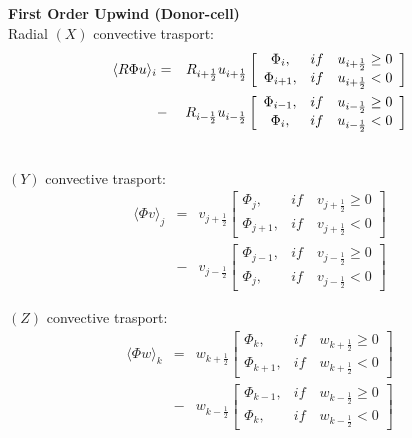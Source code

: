 {\bf First Order Upwind (Donor-cell)} \\

Radial $(X)$ convective trasport:
\begin{eqnarray}
\htmlimage{}
%
\langle R \Phi u \rangle_{i} & = & R_{i+\frac{1}{2}} u_{i+\frac{1}{2}} 
\left[ \begin{array}{cc}
\displaystyle{\Phi_{i}}, & \textstyle{if} \quad u_{i+\frac{1}{2}}  \ge 0 \\
\displaystyle{\Phi_{i+1}}, & \textstyle{if} \quad u_{i+\frac{1}{2}} < 0
\end{array} \right] \\ \nonumber
%
                                 & - & R_{i-\frac{1}{2}} u_{i-\frac{1}{2}}
\left[ \begin{array}{cc}
\displaystyle{\Phi_{i-1}}, & \textstyle{if} \quad u_{i-\frac{1}{2}}  \ge 0 \\
\displaystyle{\Phi_{i}}, & \textstyle{if} \quad u_{i-\frac{1}{2}} < 0
\end{array} \right] \\ \nonumber
\end{eqnarray}
%

$(Y)$ convective trasport:
\begin{eqnarray}
\langle \Phi v \rangle_{j} & = & v_{j+\frac{1}{2}}
\left[ \begin{array}{cc}
\displaystyle{\Phi_{j}}, & \textstyle{if} \quad v_{j+\frac{1}{2}}  \ge 0 \\
\displaystyle{\Phi_{j+1}}, & \textstyle{if} \quad v_{j+\frac{1}{2}} < 0
\end{array} \right] \\ \nonumber
%
                               & - & v_{j-\frac{1}{2}}
\left[ \begin{array}{cc}
\displaystyle{\Phi_{j-1}}, & \textstyle{if} \quad v_{j-\frac{1}{2}}  \ge 0 \\
\displaystyle{\Phi_{j}}, & \textstyle{if} \quad v_{j-\frac{1}{2}} < 0
\end{array} \right] \nonumber
%
\end{eqnarray}

$(Z)$ convective trasport:
\begin{eqnarray}
\langle \Phi w \rangle_{k} & = & w_{k+\frac{1}{2}}
\left[ \begin{array}{cc}
\displaystyle{\Phi_{k}}, & \textstyle{if} \quad w_{k+\frac{1}{2}}  \ge 0 \\
\displaystyle{\Phi_{k+1}}, & \textstyle{if} \quad w_{k+\frac{1}{2}} < 0
\end{array} \right] \\ \nonumber
%
                               & - & w_{k-\frac{1}{2}}
\left[ \begin{array}{cc}
\displaystyle{\Phi_{k-1}}, & \textstyle{if} \quad w_{k-\frac{1}{2}}  \ge 0 \\
\displaystyle{\Phi_{k}}, & \textstyle{if} \quad w_{k-\frac{1}{2}} < 0
\end{array} \right] \nonumber
%
\end{eqnarray}

